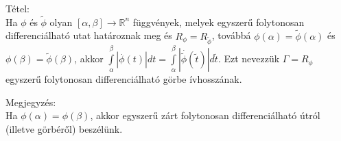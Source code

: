 \documentclass[12pt,a4paper]{scrartcl}
\newenvironment{tetel}{}{}
\newenvironment{megjegyzes}{}{}
\begin{document}
\begin{tetel}

Tétel:\\
Ha \(\phi\) és \(\widetilde{\phi}\) olyan
\(\left. \left\lbrack {\alpha,\beta} \right\rbrack\rightarrow{\mathbb{R}}^{n} \right.\)
függvények, melyek egyszerű folytonosan differenciálható utat határoznak
meg és \(R_{\phi} = R_{\widetilde{\phi}}\), továbbá
\(\phi\left( \alpha \right) = \widetilde{\phi}\left( \alpha \right)\) és
\(\phi\left( \beta \right) = \widetilde{\phi}\left( \beta \right)\),
akkor
\({\int\limits_{\alpha}^{\beta}{\left| {\overset{.}{\phi}\left( t \right)} \right|dt}} = {\int\limits_{\alpha}^{\beta}{\left| {\overset{.}{\widetilde{\phi}}\left( \widetilde{t} \right)} \right|d\widetilde{t}}}\).
Ezt nevezzük \(\Gamma = R_{\phi}\) egyszerű folytonosan differenciálható
görbe ívhosszának.

\end{tetel}

\begin{megjegyzes}

Megjegyzés:\\
Ha \(\phi\left( \alpha \right) = \phi\left( \beta \right)\), akkor
egyszerű zárt folytonosan differenciálható útról (illetve görbéről)
beszélünk.

\end{megjegyzes}
\end{document}
